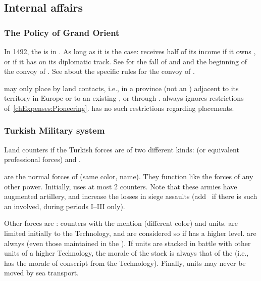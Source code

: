\subsection{Internal affairs}
\subsubsection{The Policy of Grand Orient}
 In 1492, the  is in
. As long as it is the case:
\bparag \TUR receives half of its income if it owns , or if
it has  on its diplomatic track.
\bparag See  for the fall of  and
 and the beginning of the convoy of .
\bparag See  about the specific rules for the
convoy of .

 \TUR may only place \COL by land contacts,
i.e., in a province (not an \Area) adjacent to its territory in Europe
or to an existing \COL, or through .
\bparag \TUR always ignores restrictions
of~\ref{chExpenses:Pioneering}.
\bparag \TUR has no such restrictions regarding \TP placements.

\subsubsection{Turkish Military system}

Land counters if the Turkish forces are of two different kinds:
\Janissaire (or equivalent professional forces) and \Timar.

\bparag[Janissaries] \Janissaire are the normal forces of \TUR (same
color, name). They function like the forces of any other power.
Initially, \TUR uses at most 2 \Janissaire \ARMY counters.  Note that
these armies have augmented artillery, and increase the losses in siege
assaults (add \td\ if there is such an \ARMY\faceplus involved, during
periods I--III only).

\bparag[Timars] Other forces are \Timar: counters with the \Timar
mention (different color) and \Pashas units.  \Timar are limited
initially to the \TARQ Technology, and are considered so if \TUR has a
higher level.  \Timar are always  (even those
maintained in the ).  If \Timar units are stacked in
battle with other units of a higher Technology, the morale of the stack
is always that of the \Timar (i.e., has the morale of conscript from the
\Timar Technology).  Finally, \Timar units may never be moved by sea
transport.


